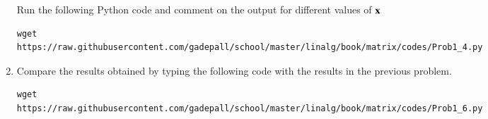 \begin{enumerate}[label=\arabic*.,ref=\thesubsection.\theenumi]
Run the following Python code and comment on the output for different values of $\mathbf{x}$
\begin{lstlisting}
wget 
https://raw.githubusercontent.com/gadepall/school/master/linalg/book/matrix/codes/Prob1_4.py
\end{lstlisting}
%
%
%
%
%
%
%
%	


%
%
%
%
%
%
%
%
%
%
%
%
%
%
%
%
%
%
%
%
\item
	Compare the results obtained by typing the following code with the results in the previous problem.
\begin{lstlisting}
wget 
https://raw.githubusercontent.com/gadepall/school/master/linalg/book/matrix/codes/Prob1_6.py
\end{lstlisting}



\end{enumerate}
